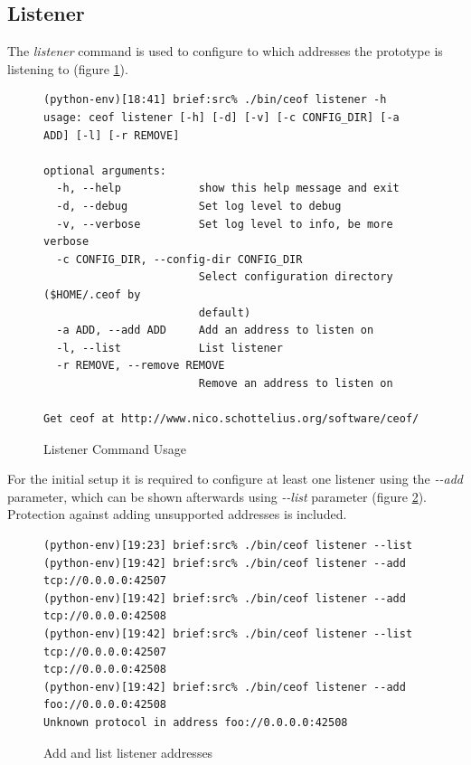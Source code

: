 \subsection{Listener}
The \textit{listener} command is used
to configure to which addresses the prototype is listening to (figure
\ref{listenerusage}).
\begin{figure}[htbp]
\caption{Listener Command Usage}
\label{listenerusage}
\begin{verbatim}
(python-env)[18:41] brief:src% ./bin/ceof listener -h
usage: ceof listener [-h] [-d] [-v] [-c CONFIG_DIR] [-a ADD] [-l] [-r REMOVE]

optional arguments:
  -h, --help            show this help message and exit
  -d, --debug           Set log level to debug
  -v, --verbose         Set log level to info, be more verbose
  -c CONFIG_DIR, --config-dir CONFIG_DIR
                        Select configuration directory ($HOME/.ceof by
                        default)
  -a ADD, --add ADD     Add an address to listen on
  -l, --list            List listener
  -r REMOVE, --remove REMOVE
                        Remove an address to listen on

Get ceof at http://www.nico.schottelius.org/software/ceof/
\end{verbatim}
\end{figure}
For the initial setup it is required to configure at least one listener
using the \textit{-{}-add} parameter, which can be shown afterwards using
\textit{-{}-list} parameter (figure \ref{addandlistlistener}). 
Protection against adding unsupported addresses is included.
\begin{figure}[htbp][htb]
\caption{Add and list listener addresses}
\label{addandlistlistener}
\begin{verbatim}
(python-env)[19:23] brief:src% ./bin/ceof listener --list
(python-env)[19:42] brief:src% ./bin/ceof listener --add tcp://0.0.0.0:42507
(python-env)[19:42] brief:src% ./bin/ceof listener --add tcp://0.0.0.0:42508
(python-env)[19:42] brief:src% ./bin/ceof listener --list                   
tcp://0.0.0.0:42507
tcp://0.0.0.0:42508
(python-env)[19:42] brief:src% ./bin/ceof listener --add foo://0.0.0.0:42508 
Unknown protocol in address foo://0.0.0.0:42508
\end{verbatim}
\end{figure}
